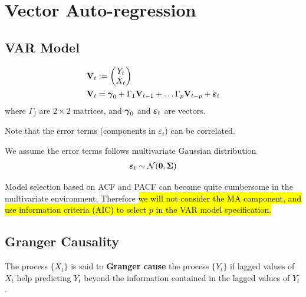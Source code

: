 \documentclass[11pt]{article}
\begin{document}
	\section{Vector Auto-regression}
	    \subsection{VAR Model}
            \begin{definition}
                \begin{align}
                    \textbf{V}_t &:= \begin{pmatrix}Y_t \\ X_t \end{pmatrix} \\
                    \textbf{V}_t &= \boldsymbol{\gamma}_0 + \Gamma_1 \textbf{V}_{t-1} + \dots \Gamma_p \textbf{V}_{t-p} + \boldsymbol{\varepsilon}_t
                \end{align}
                where $\Gamma_j$ are $2 \times 2$ matrices, and $\boldsymbol{\gamma}_0$ and $\boldsymbol{\varepsilon}_t$ are vectors.
            \end{definition}
            
            \begin{remark}
                Note that the error terms (components in $\varepsilon_t$) can be correlated.
            \end{remark}
            
            \begin{remark}
                We assume the error terms follows multivariate Gaussian distribution
                \begin{gather}
                    \boldsymbol{\varepsilon}_t \sim \mathcal{{N}}(\textbf{0}, \boldsymbol{\Sigma})
                \end{gather}
            \end{remark}
            
            \begin{remark}
                Model selection based on ACF and PACF can become quite cumbersome in the multivariate environment. Therefore \hl{we will not consider the MA component, and use information criteria (AIC) to select $p$ in the VAR model specification.}
    	    \end{remark}
    	    
        \subsection{Granger Causality}
            \begin{definition}
                The process $\{X_t\}$ is said to \textbf{Granger cause} the process $\{Y_t\}$ if lagged values of $X_t$ help predicting $Y_t$ beyond the information contained in the lagged values of $Y_t$.
            \end{definition}
            
\end{document}
